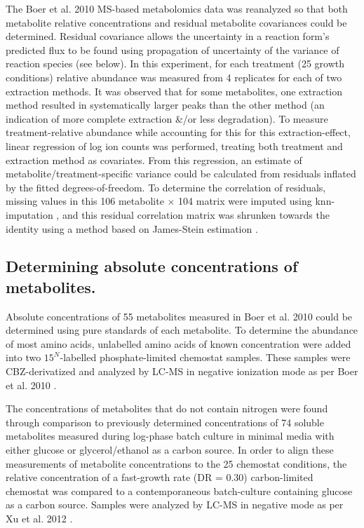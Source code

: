 The Boer et al. 2010 MS-based metabolomics data \cite{main-Boer:2010fb} was reanalyzed so that both metabolite relative concentrations and residual metabolite covariances could be determined.  Residual covariance allows the uncertainty in a reaction form's predicted flux to be found using propagation of uncertainty of the variance of reaction species (see below).  In this experiment, for each treatment (25 growth conditions) relative abundance was measured from 4 replicates for each of two extraction methods.  It was observed that for some metabolites, one extraction method resulted in systematically larger peaks than the other method (an indication of more complete extraction \&/or less degradation).  To measure treatment-relative abundance while accounting for this for this extraction-effect, linear regression of log ion counts was performed, treating both treatment and extraction method as covariates.  From this regression, an estimate of metabolite/treatment-specific variance could be calculated from residuals inflated by the fitted degrees-of-freedom.  To determine the correlation of residuals, missing values in this 106 metabolite $\times$ 104 matrix were imputed using knn-imputation \cite{Troyanskaya:2001uh}, and this residual correlation matrix was shrunken towards the identity using a method based on James-Stein estimation \cite{Schaefer:2010tv}.

\subsection{Determining absolute concentrations of metabolites.}

Absolute concentrations of 55 metabolites measured in Boer et al. 2010 could be determined using pure standards of each metabolite.  To determine the abundance of most amino acids, unlabelled amino acids of known concentration were added into two $15^{N}$-labelled phosphate-limited chemostat samples.  These samples were CBZ-derivatized and analyzed by LC-MS in negative ionization mode as per Boer et al. 2010 \cite{main-Boer:2010fb}.

The concentrations of metabolites that do not contain nitrogen were found through comparison to previously determined concentrations of 74 soluble metabolites measured during log-phase batch culture in minimal media with either glucose or glycerol/ethanol as a carbon source.  In order to align these measurements of metabolite concentrations to the 25 chemostat conditions, the relative concentration of a fast-growth rate (DR = 0.30) carbon-limited chemostat was compared to a contemporaneous batch-culture containing glucose as a carbon source.  Samples were analyzed by LC-MS in negative mode as per Xu et al. 2012 \cite{main-Xu:2012gg}.

